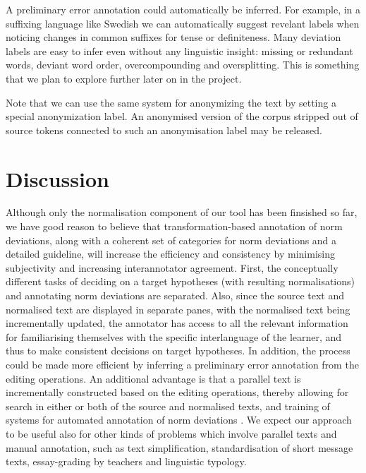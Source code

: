 \documentclass[10pt, a4paper]{article}
\newcommand{\dan}[1]{{\color{Fuchsia}{Dan: #1}}}
\newcommand{\elena}[1]{{\color{BrickRed}{Elena: #1}}}
\newcommand{\normAnn}[0]{our tool }
\begin{document}
A preliminary error annotation could automatically be inferred.
For example, in a suffixing language like Swedish we can automatically
suggest revelant labels when noticing changes in common suffixes for tense
or definiteness.
Many deviation labels are easy to infer even without any linguistic
insight: missing or redundant words, deviant word order, overcompounding
and oversplitting.
This is something that we plan to explore further later on in the project.

Note that we can use the same system for anonymizing the text by setting a
special anonymization label. An anonymised version of the corpus stripped
out of source tokens connected to such an anonymisation label may be released.
\dan{could be moved to discussion}

\section{Discussion}
\label{sec:discussion}


Although only the normalisation component of \normAnn has been finsished so far, we have good reason to believe that transformation-based annotation of norm deviations, along with a coherent set of categories for norm deviations and a detailed guideline, will increase the efficiency and consistency by minimising subjectivity and increasing interannotator agreement. \dan{Because:}
First, the conceptually different tasks of deciding on a target hypotheses (with resulting normalisations) and annotating norm deviations are separated.
Also, since the source text and normalised text are displayed in separate panes, with the normalised text being incrementally updated, the annotator has access to all the relevant information for familiarising themselves with the specific interlanguage of the learner, and thus to make consistent decisions on target hypotheses.
In addition, the process could be made more efficient by inferring a preliminary error annotation from the editing operations. An additional advantage is that a parallel text is incrementally constructed based on the editing operations, thereby allowing for search in either or both of the source and normalised texts, and training of systems for automated annotation of norm deviations \cite{sproat2016rnn}.
We expect our approach to be useful also for other kinds of problems which involve parallel texts and manual annotation, such as text simplification, standardisation of short message texts, essay-grading by teachers and linguistic typology. %
\end{document}
